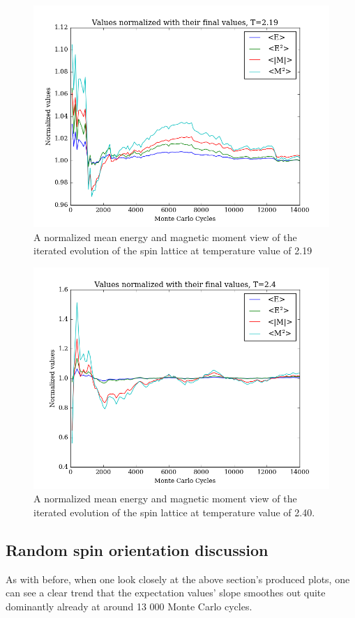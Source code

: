 \documentclass[11pt,a4paper,notitlepage,twocolumn]{article}
\begin{document}
\begin{figure}
[H]\center
\includegraphics[scale=0.35]{../figs/4c/Prob_L20_mc100000_T219_spinrandom.png}
\caption{A normalized mean energy and magnetic moment view of the iterated evolution of the spin lattice at temperature value of 2.19}
\end{figure}
\begin{figure}
[H]\center
\includegraphics[scale=0.35]{../figs/4c/Prob_L20_mc100000_T240_spinrandom.png}
\caption{A normalized mean energy and magnetic moment view of the iterated evolution of the spin lattice at temperature value of 2.40.}
\end{figure}
\subsection{Random spin orientation discussion}\label{disc:stabilize}
As with before, when one look closely at the above section's produced plots, one can see a clear trend that the expectation values' slope smoothes out quite dominantly already at around 13 000 Monte Carlo cycles.
\end{document}
